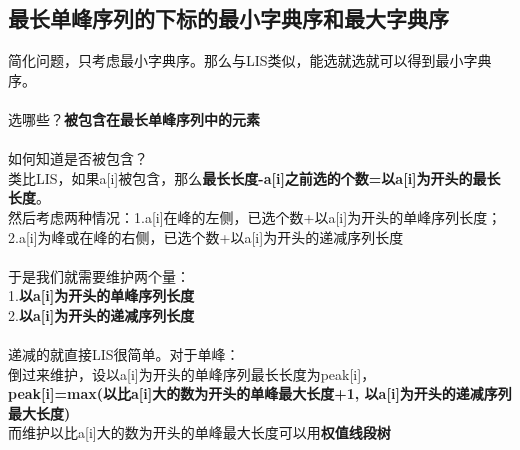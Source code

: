\subsection{最长单峰序列的下标的最小字典序和最大字典序}
    简化问题，只考虑最小字典序。那么与LIS类似，能选就选就可以得到最小字典序。\\\\
    选哪些？\textbf{被包含在最长单峰序列中的元素}\\\\
    如何知道是否被包含？\\
    类比LIS，如果a[i]被包含，那么\textbf{最长长度-a[i]之前选的个数=以a[i]为开头的最长长度}。\\
    然后考虑两种情况：1.a[i]在峰的左侧，已选个数+以a[i]为开头的单峰序列长度；
    2.a[i]为峰或在峰的右侧，已选个数+以a[i]为开头的递减序列长度\\\\
    于是我们就需要维护两个量：\\
    1.\textbf{以a[i]为开头的单峰序列长度}\\
    2.\textbf{以a[i]为开头的递减序列长度}\\\\
    递减的就直接LIS很简单。对于单峰：\\
    倒过来维护，设以a[i]为开头的单峰序列最长长度为peak[i]，\\
    \textbf{peak[i]=max(以比a[i]大的数为开头的单峰最大长度+1, 以a[i]为开头的递减序列最大长度)}\\
    而维护以比a[i]大的数为开头的单峰最大长度可以用\textbf{权值线段树}
